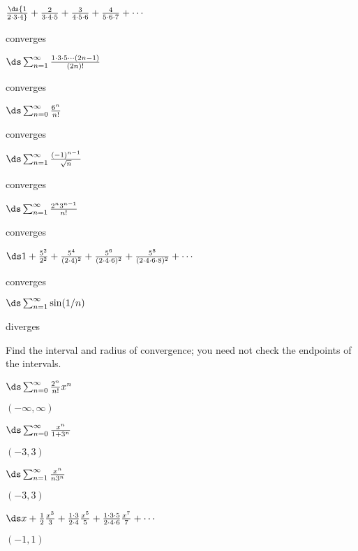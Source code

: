 \begin{exercises}
\exercise $\ds{1\over 2\cdot 3\cdot 4}+{2\over 3\cdot
  4\cdot 5}+{3\over 4\cdot 5\cdot 6}+{4\over 5\cdot 6 \cdot 7}+\cdots$
\begin{answer} converges
\end{answer}

\exercise $\ds\sum_{n=1}^\infty {1\cdot3\cdot5\cdots(2n-1)\over (2n)!}$
\begin{answer} converges
\end{answer}

\exercise $\ds\sum_{n=0}^\infty {6^n\over n!}$
\begin{answer} converges
\end{answer}

\exercise $\ds\sum_{n=1}^\infty {(-1)^{n-1}\over\sqrt n}$
\begin{answer} converges
\end{answer}

\exercise $\ds\sum_{n=1}^\infty {2^n 3^{n-1}\over n!}$
\begin{answer} converges
\end{answer}

\exercise $\ds 1+ {5^2\over 2^2}+{5^4\over (2\cdot4)^2}
 +{5^6\over(2\cdot4\cdot6)^2}+ {5^8\over(2\cdot4\cdot6\cdot8)^2}+\cdots$
\begin{answer} converges
\end{answer}

\exercise $\ds \sum_{n=1}^\infty \sin(1/n)$
\begin{answer} diverges
\end{answer}

\vskip50pt\vskip-50pt
\msk\noindent
Find the interval and radius of convergence; you need not check the
endpoints of the intervals.

\exercise $\ds\sum_{n=0}^\infty {2^n\over n!}x^n$
\begin{answer} $(-\infty,\infty)$
\end{answer}

\exercise $\ds\sum_{n=0}^\infty {x^n\over 1+3^n}$
\begin{answer} $(-3,3)$
\end{answer}

\exercise $\ds\sum_{n=1}^\infty {x^n\over n3^n}$
\begin{answer} $(-3,3)$
\end{answer}

\exercise $\ds x+{1\over 2}{x^3\over3} + {1\cdot 3\over 2\cdot4}{x^5\over5}+
{1\cdot 3\cdot5\over 2\cdot4\cdot6}{x^7\over7}+\cdots$
\begin{answer} $(-1,1)$
\end{answer}


\end{exercises}
